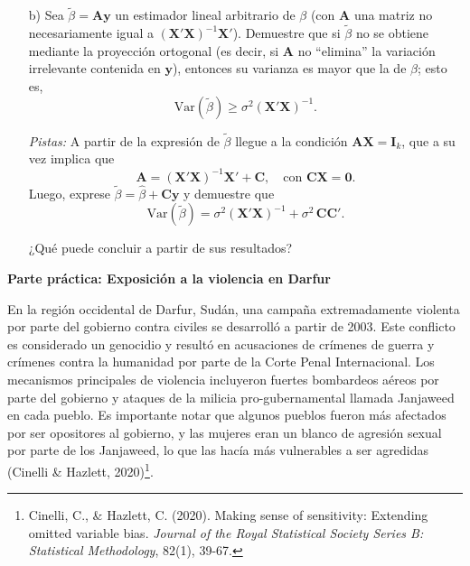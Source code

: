 \documentclass[a4paper, answers, addpoints, 11pt]{exam}
\newenvironment{solucion}{%
  \begin{mdframed}[
    backgroundcolor=blue!5,    %
    linecolor=blue!50,          %
    linewidth=2pt,              %
    leftmargin=10pt,            %
    rightmargin=10pt,           %
    topline=true,              %
    bottomline=true,            %
    roundcorner=10pt,           %
    innerleftmargin=10pt,       %
    innerrightmargin=10pt,      %
    innerbottommargin=10pt,     %
    innertopmargin=10pt         %
  ]%
  \begin{tcolorbox}[colframe=blue!50!black, colback=blue!50, coltitle=white, sharp corners=all, boxrule=1mm, width=\textwidth, halign=left, valign=center, top=0mm, bottom=0mm, left=0mm, right=0mm] \textbf{Solución} \end{tcolorbox} }{\end{mdframed}}
\begin{document}
\begin{enumerate}
\begin{itemize}
\begin{solucion}
\begin{proof}
\end{proof}
La clave en esta prueba es que $X^\top P=X^\top$. Esto es porque  \( P = X (X^\top X)^{-1} X^\top \), y la propiedad de la proyección ortogonal implica que proyectar \( X \) sobre el espacio generado por sus columnas no cambia las columnas de \( X \).  La estimación de \( \beta \) mediante la proyección ortogonal \( \hat{\beta} = (X'X)^{-1} X'y \) garantiza que toda la variación de \( y \) que no está contenida en el espacio columna de \( X \) se elimina. Los residuos \( \hat{\epsilon} = (I_n - P)y \) son ortogonales a todo vector en dicho espacio.\textcolor{red}{revisar}

 \end{solucion}


    \item[b)] Sea \(\tilde{\beta} = \mathbf{A}\mathbf{y}\) un estimador lineal arbitrario de \(\beta\) (con \(\mathbf{A}\) una matriz no necesariamente igual a \((\mathbf{X}'\mathbf{X})^{-1}\mathbf{X}'\)). Demuestre que si \(\tilde{\beta}\) no se obtiene mediante la proyección ortogonal (es decir, si \(\mathbf{A}\) no ``elimina'' la variación irrelevante contenida en \(\mathbf{y}\)), entonces su varianza es mayor que la de \(\hat{\beta}\); esto es,
\[
\mathrm{Var}(\tilde{\beta}) \geq \sigma^2 (\mathbf{X}'\mathbf{X})^{-1}.
\]

\textit{Pistas:} A partir de la expresión de $\tilde{\beta}$ llegue a la condición \(\mathbf{A}\mathbf{X} = \mathbf{I}_k\), que a su vez implica que
\[
\mathbf{A} = (\mathbf{X}'\mathbf{X})^{-1}\mathbf{X}' + \mathbf{C}, \quad \text{con } \mathbf{C}\mathbf{X} = \mathbf{0}.
\]
Luego, exprese \(\tilde{\beta} = \hat{\beta} + \mathbf{C}\mathbf{y}\) y demuestre que
\[
\mathrm{Var}(\tilde{\beta}) = \sigma^2 (\mathbf{X}'\mathbf{X})^{-1} + \sigma^2\,\mathbf{C}\mathbf{C}'.
\] 

¿Qué puede concluir a partir de sus resultados?

\end{itemize}
    \end{enumerate}

    \bigskip


\Large\textbf{Parte práctica: Exposición a la violencia en Darfur}

\normalsize\bigskip En la región occidental de Darfur, Sudán, una campaña extremadamente violenta por parte del gobierno contra civiles se desarrolló a partir de 2003. Este conflicto es considerado un genocidio y resultó en acusaciones de crímenes de guerra y crímenes contra la humanidad por parte de la Corte Penal Internacional. Los mecanismos principales de violencia incluyeron fuertes bombardeos aéreos por parte del gobierno y ataques de la milicia pro-gubernamental llamada Janjaweed en cada pueblo. Es importante notar que algunos pueblos fueron más afectados por ser opositores al gobierno, y las mujeres eran un blanco de agresión sexual por parte de los Janjaweed, lo que las hacía más vulnerables a ser agredidas (Cinelli \& Hazlett, 2020)\footnote{Cinelli, C., \& Hazlett, C. (2020). Making sense of sensitivity: Extending omitted variable bias. \textit{Journal of the Royal Statistical Society Series B: Statistical Methodology}, 82(1), 39-67.
}.
\end{document}
